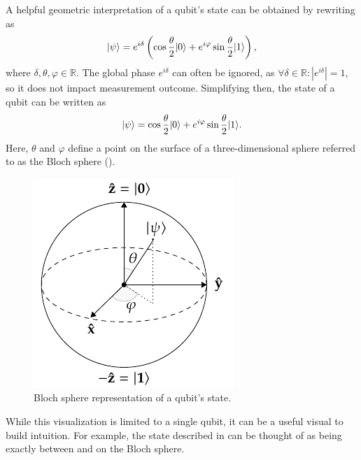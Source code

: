 A helpful geometric interpretation of a qubit's state can be obtained by rewriting  as
\begin{equation}
\vert{\psi}\rangle = e^{i\delta} \left(\cos\dfrac{\theta}{2}\vert{0}\rangle + e^{i\varphi}\sin\dfrac{\theta}{2}\vert{1}\rangle\right),
\end{equation}
where $\delta, \theta, \varphi \in \mathbb{R}$.
The global phase $e^{i\delta}$ can often be ignored, as $\forall \delta \in \mathbb{R} : |e^{i\delta}| = 1$, so it does not impact measurement outcome.
Simplifying then, the state of a qubit can be written as
\begin{equation}
\vert{\psi}\rangle = \cos\dfrac{\theta}{2}\vert{0}\rangle + e^{i\varphi}\sin\dfrac{\theta}{2}\vert{1}\rangle.
\end{equation}
Here, $\theta$ and $\varphi$ define a point on the surface of a three-dimensional sphere referred to as the Bloch sphere ().
\begin{figure}[ht]
    \centering
    \includegraphics[width=0.33\linewidth]{figures/bloch-sphere.pdf}
    \caption[Bloch sphere representation of a qubit's state.]{
        Bloch sphere representation of a qubit's state.
    }
    \label{fig:bloch-sphere}
\end{figure}
While this visualization is limited to a single qubit, it can be a useful visual to build intuition.
For example, the \ket{+} state described in  can be thought of as being exactly between  and  on the Bloch sphere.

